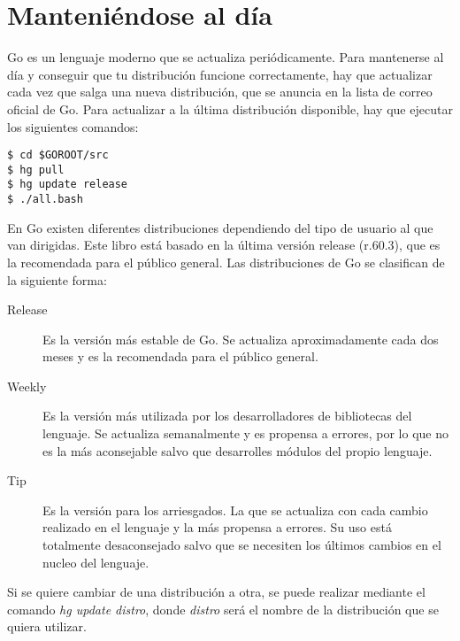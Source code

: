 \section{Manteniéndose al día\label{manteniendose}}

Go es un lenguaje moderno que se actualiza periódicamente. Para mantenerse al
día y conseguir que tu distribución funcione correctamente, hay que actualizar
cada vez que salga una nueva distribución, que se anuncia en la lista de correo
oficial de Go. Para actualizar a la última distribución disponible, hay que
ejecutar los siguientes comandos:

\begin{lstlisting}[numbers=none]
$ cd $GOROOT/src
$ hg pull
$ hg update release
$ ./all.bash
\end{lstlisting}

En Go existen diferentes distribuciones dependiendo del tipo de usuario al que
van dirigidas. Este libro está basado en la última versión release (r.60.3), que
es la recomendada para el público general. Las distribuciones de Go se
clasifican de la siguiente forma:

\begin{description}
	\item[Release] Es la versión más estable de Go. Se actualiza aproximadamente
	cada dos meses y es la recomendada para el público general.
	\item[Weekly] Es la versión más utilizada por los desarrolladores de
	bibliotecas del lenguaje. Se actualiza semanalmente y es propensa a errores,
	por lo que no es la más aconsejable salvo que desarrolles módulos del propio
	lenguaje.
	\item[Tip] Es la versión para los arriesgados. La que se actualiza con cada
	cambio realizado en el lenguaje y la más propensa a errores. Su uso está
	totalmente desaconsejado salvo que se necesiten los últimos cambios en el
	nucleo del lenguaje.
\end{description}

Si se quiere cambiar de una distribución a otra, se puede realizar mediante el
comando \emph{hg update distro}, donde \emph{distro} será el nombre de la
distribución que se quiera utilizar.

\newpage
